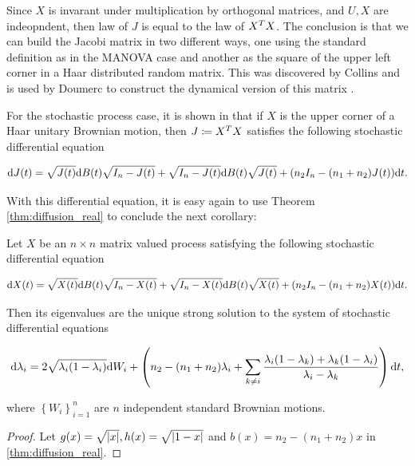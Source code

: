 Since $X$ is invarant under multiplication by orthogonal matrices, and $U,X$ are indeopndent, then law of $J$ is equal to the law of $X^T X$. The conclusion is that we can build the Jacobi matrix in two different ways, one using the standard definition as in the MANOVA case and another as the square of the upper left corner in a Haar distributed random matrix. This was discovered by Collins \cite{thesis:collins} and is used by Doumerc to construct the dynamical version of this matrix \cite{doumerc2005matrices}.

For the stochastic process case, it is shown in \cite{doumerc2005matrices} that if $X$ is the upper corner of a Haar unitary Brownian motion, then $J \coloneqq X^T X$ satisfies the following stochastic differential equation

\begin{equation*}
    \mathrm d J (t) = \sqrt{J(t)} \mathrm d B(t) \sqrt{I_n - J(t)} + \sqrt{I_n - J(t)} \mathrm d B(t) \sqrt{J(t)} + (n_2 I_n - (n_1 + n_2) J(t) ) \mathrm d t.
\end{equation*}

With this differential equation, it is easy again to use Theorem \ref{thm:diffusion_real} to conclude the next corollary: 

\begin{corollary}
    Let $X$ be an $n\times n$ matrix valued process satisfying the following stochastic differential equation

    \begin{equation*}
        \mathrm d X (t) = \sqrt{X(t)} \mathrm d B(t) \sqrt{I_n - X(t)} + \sqrt{I_n - X(t)} \mathrm d B(t) \sqrt{X(t)} + (n_2 I_n - (n_1 + n_2) X(t) ) \mathrm d t.
    \end{equation*}

    Then its eigenvalues are the unique strong solution to the system of stochastic differential equations

    \begin{equation} \label{eq:jacobi}
        \mathrm d \lambda_i = 2 \sqrt{\lambda_i(1-\lambda_i)} \mathrm d W_i + \left( n_2 -(n_1 + n_2)\lambda_i + \sum_{k\neq i} \frac{\lambda_i(1-\lambda_k) + \lambda_k(1-\lambda_i)}{\lambda_i - \lambda_k} \right) \mathrm d t,
    \end{equation}

    \noindent where $\left\{ W_{i} \right\}_{i=1}^n$ are $n$ independent standard Brownian motions.
\end{corollary}


\begin{proof}
    Let $g(x) = \sqrt{\lvert x \rvert}, h(x) = \sqrt{\lvert 1-x \rvert}$ and $b(x) = n_2 - (n_1 + n_2)x$ in \ref{thm:diffusion_real}. 
\end{proof}


